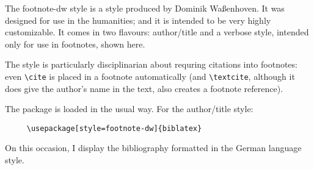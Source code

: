 
\usepackage[style=german]{csquotes}
\usepackage[german,english]{babel}
\usepackage[style=footnote-dw,backend=biber]{biblatex}


\renewcommand{\showingstyle}{DW Footnote}


The \textsf{footnote-dw} style is a style produced by Dominik Waßenhoven. It was designed for use in the humanities; and it is intended to be very highly customizable. It comes in two flavours: author/title and a verbose style, intended only for use in footnotes, shown here.

The style is particularly disciplinarian about requring citations into footnotes: even \verb~\cite~ is placed in a footnote automatically (and \verb~\textcite~, although it does give the author's name in the text, also creates a footnote reference).

\quad The package is loaded in the usual way. For the author/title style:
\begin{verbatim}
     \usepackage[style=footnote-dw]{biblatex}
\end{verbatim}

On this occasion, I display the bibliography formatted in the German language style.





